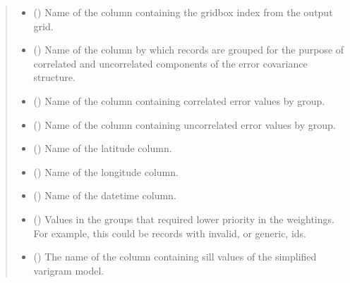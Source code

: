 \documentclass[letterpaper,10pt,english]{sphinxmanual}
\begin{document}
\begin{fulllineitems}
\begin{quote}
\begin{description}
\begin{itemize}
\item {}
\sphinxAtStartPar
{} () \textendash{} Name of the column containing the gridbox index from the output grid.

\item {}
\sphinxAtStartPar
{} () \textendash{} Name of the column by which records are grouped for the purpose of
correlated and uncorrelated components of the error covariance
structure.

\item {}
\sphinxAtStartPar
{} () \textendash{} Name of the column containing correlated error values by group.

\item {}
\sphinxAtStartPar
{} () \textendash{} Name of the column containing uncorrelated error values by group.

\item {}
\sphinxAtStartPar
{} () \textendash{} Name of the latitude column.

\item {}
\sphinxAtStartPar
{} () \textendash{} Name of the longitude column.

\item {}
\sphinxAtStartPar
{} () \textendash{} Name of the datetime column.

\item {}
\sphinxAtStartPar
{} () \textendash{} Values in the groups that required lower priority in the weightings.
For example, this could be records with invalid, or generic, ids.

\item {}
\sphinxAtStartPar
{} () \textendash{} The name of the column containing sill values of the simplified varigram
model.


\end{itemize}
\end{description}
\end{quote}
\end{fulllineitems}
\end{document}
